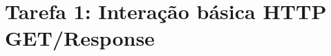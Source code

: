 \section*{Tarefa 1: Interação básica HTTP GET/Response}

\begin{questions}
   
   
   
\end{questions}